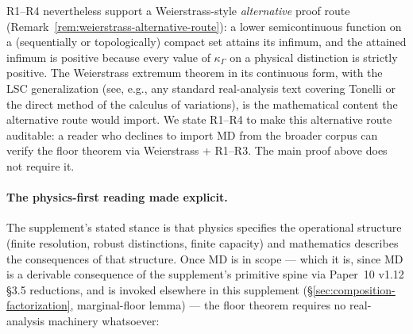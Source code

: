 \documentclass[11pt]{article}
\begin{document}
R1--R4 nevertheless support a Weierstrass-style \emph{alternative} proof route (Remark~\ref{rem:weierstrass-alternative-route}): a lower semicontinuous function on a (sequentially or topologically) compact set attains its infimum, and the attained infimum is positive because every value of $\kappa_\Gamma$ on a physical distinction is strictly positive.  The Weierstrass extremum theorem in its continuous form, with the LSC generalization (see, e.g., any standard real-analysis text covering Tonelli or the direct method of the calculus of variations), is the mathematical content the alternative route would import.  We state R1--R4 to make this alternative route auditable: a reader who declines to import MD from the broader corpus can verify the floor theorem via Weierstrass + R1--R3.  The main proof above does not require it.

\paragraph{The physics-first reading made explicit.}
The supplement's stated stance is that physics specifies the operational structure (finite resolution, robust distinctions, finite capacity) and mathematics describes the consequences of that structure.  Once MD is in scope --- which it is, since MD is a derivable consequence of the supplement's primitive spine via Paper~10 v1.12 \S3.5 reductions, and is invoked elsewhere in this supplement (\S\ref{sec:composition-factorization}, marginal-floor lemma) --- the floor theorem requires no real-analysis machinery whatsoever:
\end{document}
